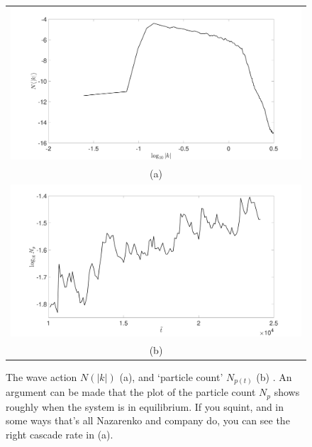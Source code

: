 \documentclass[a4paper,11pt]{article}
\begin{document}
\begin{figure}[!h]
\centering
\begin{tabular}{c}
\includegraphics[width=.95\textwidth]{action_cascade_K_128_Lx_128_tf_1pt5e4} \\ 
(a) \\
\includegraphics[width=.95\textwidth]{np_count_K_128_Lx_128_tf_1pt5e4}\\
(b)
\end{tabular}
\caption{The wave action $N(|k|)$ (a), and `particle count' $N_{p(t)}$ (b) .  An argument can be made that the plot of the particle count $N_{p}$ shows roughly when the system is in equilibrium. If you squint, and in some ways that's all Nazarenko and company do, you can see the right cascade rate in (a).}
\end{figure}
\end{document}
